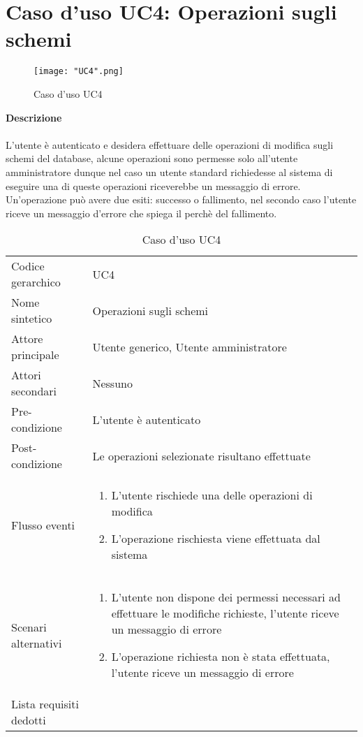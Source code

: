 \documentclass[a4paper]{report}
\begin{document}
	 \section{Caso d'uso UC4: Operazioni sugli schemi}
	 	\begin{figure}[H]
			\centering
			\texttt{[image: "UC4".png]}
			\caption{Caso d'uso UC4}
		\end{figure}
	 \textbf{Descrizione} \\ \\
	 L'utente è autenticato e desidera effettuare delle operazioni di modifica sugli schemi del database, 
	 alcune operazioni sono permesse solo all'utente amministratore dunque nel caso un utente standard
	 richiedesse al sistema di eseguire una di queste operazioni riceverebbe un messaggio di errore.
	 Un'operazione può avere due esiti: successo o fallimento, nel secondo caso l'utente riceve un
	  messaggio d'errore che spiega il perchè del fallimento.
		\begin{table}[H]
		\begin{tabularx}{\textwidth}{X | X}\toprule
			\rowcolor{orange!65}Codice gerarchico & UC4 \\
			Nome sintetico & Operazioni sugli schemi \\
			\rowcolor{orange!65}Attore principale & Utente generico, Utente amministratore\\
			Attori secondari & Nessuno \\
			\rowcolor{orange!65}Pre-condizione & L'utente è autenticato\\
			Post-condizione & Le operazioni selezionate risultano effettuate \\
			\rowcolor{orange!65}Flusso eventi & \begin{enumerate}
			\item L'utente rischiede una delle operazioni di modifica
			\item L'operazione rischiesta viene effettuata dal sistema
			\end{enumerate} \\
			Scenari alternativi & \begin{enumerate}
			\item L'utente non dispone dei permessi necessari ad effettuare le modifiche richieste, l'utente
			riceve un messaggio di errore
			\item L'operazione richiesta non è stata effettuata, l'utente riceve un messaggio di errore
			\end{enumerate} \\
			\rowcolor{orange!65}Lista requisiti dedotti & \\
			\bottomrule
		\end{tabularx}
		\caption{Caso d'uso UC4}
	 \end{table}
\end{document}
